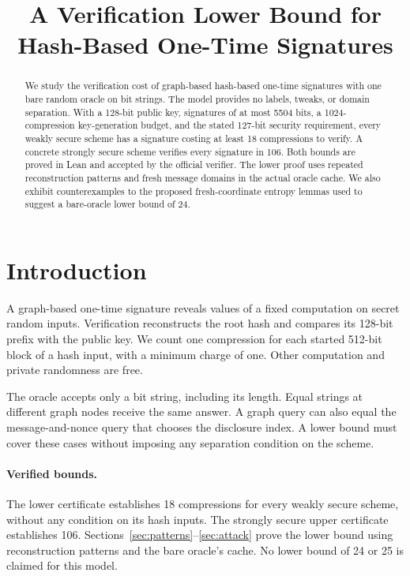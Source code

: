 \documentclass[10pt]{article}
\title{A Verification Lower Bound for Hash-Based One-Time Signatures}
\author{}
\date{}
\begin{document}
\maketitle

\begin{abstract}
We study the verification cost of graph-based hash-based one-time signatures with one bare random oracle on bit strings. The model provides no labels, tweaks, or domain separation. With a 128-bit public key, signatures of at most 5504 bits, a 1024-compression key-generation budget, and the stated 127-bit security requirement, every weakly secure scheme has a signature costing at least 18 compressions to verify. A concrete strongly secure scheme verifies every signature in 106. Both bounds are proved in Lean and accepted by the official verifier. The lower proof uses repeated reconstruction patterns and fresh message domains in the actual oracle cache. We also exhibit counterexamples to the proposed fresh-coordinate entropy lemmas used to suggest a bare-oracle lower bound of 24.
\end{abstract}

\setcounter{tocdepth}{2}
\tableofcontents

\section{Introduction}\label{sec:intro}

A graph-based one-time signature reveals values of a fixed computation on secret random inputs. Verification reconstructs the root hash and compares its 128-bit prefix with the public key. We count one compression for each started 512-bit block of a hash input, with a minimum charge of one. Other computation and private randomness are free.

The oracle accepts only a bit string, including its length. Equal strings at different graph nodes receive the same answer. A graph query can also equal the message-and-nonce query that chooses the disclosure index. A lower bound must cover these cases without imposing any separation condition on the scheme.

\paragraph{Verified bounds.}
The lower certificate establishes 18 compressions for every weakly secure scheme, without any condition on its hash inputs. The strongly secure upper certificate establishes 106. Sections~\ref{sec:patterns}--\ref{sec:attack} prove the lower bound using reconstruction patterns and the bare oracle's cache. No lower bound of 24 or 25 is claimed for this model.
\end{document}
